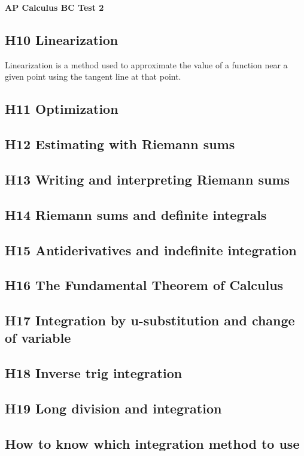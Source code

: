 \documentclass[letterpaper, 12pt]{article}
\begin{document}
\begin{center}
\textbf{{\Large AP Calculus BC Test 2}}
\end{center}

\subsection*{H10 Linearization}

Linearization is a method used to approximate the value of a function near a given point using the tangent line at that point. 

\subsection*{H11 Optimization}

\subsection*{H12 Estimating with Riemann sums}

\subsection*{H13 Writing and interpreting Riemann sums}

\subsection*{H14 Riemann sums and definite integrals}

\subsection*{H15 Antiderivatives and indefinite integration}

\subsection*{H16 The Fundamental Theorem of Calculus}

\subsection*{H17 Integration by u-substitution and change of variable}

\subsection*{H18 Inverse trig integration}

\subsection*{H19 Long division and integration}

\subsection*{How to know which integration method to use}
\end{document}
